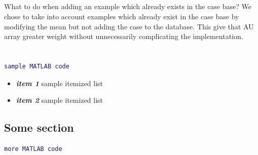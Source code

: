 \documentclass[a4paper,12pt,oneside,final]{report}
\newenvironment{changemargin}[2]{\begin{list}{}{%
\setlength{\topsep}{0pt}%
\setlength{\leftmargin}{0pt}%
\setlength{\rightmargin}{0pt}%
\setlength{\listparindent}{\parindent}%
\setlength{\itemindent}{\parindent}%
\setlength{\parsep}{0pt plus 1pt}%
\addtolength{\leftmargin}{#1}%
\addtolength{\rightmargin}{#2}%
}\item }{\end{list}}
\begin{document}
\paragraph{}
What to do when adding an example which already exists in the case base?  We chose to take into account examples which already exist in the case base by modifying the mean but not adding the case to the database.  This give that AU array greater weight without unnecessarily complicating the implementation.

\paragraph{}

\chapter{}
\paragraph{}
\section{}
\paragraph{} 
\begin{changemargin}{-5mm}{-5mm}
\begin{lstlisting}[language=Matlab, frame=single]
sample MATLAB code
\end{lstlisting}
\end{changemargin}
\label{ch:build}
\begin{itemize}
\item {\bf \textit{item 1} } sample itemized list
\item {\bf \textit{item 2} } sample itemized list
\end{itemize}

\paragraph{}
\paragraph{}
\section{Some section}
\begin{changemargin}{-5mm}{-5mm}
\begin{lstlisting}[language=Matlab, frame=single]
more MATLAB code
\end{lstlisting}
\end{changemargin}
\end{document}
